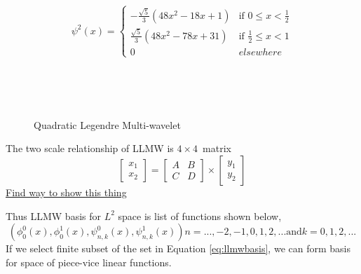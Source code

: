 \begin{equation}
\psi^2(x)=
\left\{
    \begin{array}{ll}
        -\frac{\sqrt{5}}{3}(48x^2-18x+1)  & \mbox{if } 0 \leq x < \frac{1}{2} \\
        \frac{\sqrt{5}}{3}(48x^2-78x+31)  & \mbox{if } \frac{1}{2} \leq x < 1 \\
        0 & elsewhere
    \end{array}
\right.
\end{equation}
\begin{figure*}
\centering
{}
\\
\\
\\
\caption{Quadratic Legendre Multi-wavelet}
\label{fig:qlmwphipsi}
\end{figure*}



The two scale relationship of LLMW is $4 \times 4$~matrix
\begin{equation}
\left[ \begin{array}{c} x_1 \\ x_2 \end{array} \right] = \begin{bmatrix} A & B \\ C & D \end{bmatrix} \times \left[ \begin{array}{c} y_1 \\ y_2 \end{array} \right]
\end{equation}
\underline{Find way to show this thing}


Thus LLMW basis for $L^2$ space is list of functions shown below,
\begin{equation}\label{eq:llmwbasis}
(\phi^0_0(x),\phi^1_0(x),\psi^0_{n,k}(x),\psi^1_{n,k}(x)) n=..., -2, -1, 0, 1, 2,... \text{and} k=0,1,2,...
\end{equation}
If we select finite subset of the set in Equation \ref{eq:llmwbasis}, we can form basis for space of piece-vice linear functions. 

